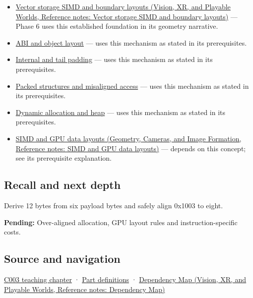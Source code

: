 \begin{itemize}
\item
  \href{../07-Vision-XR-and-Playable-Worlds/main.pdf\#nameddest=appendix-26bf6bf2fb8b}{Vector storage SIMD and boundary layouts (Vision, XR, and Playable Worlds, Reference notes: Vector storage SIMD and boundary layouts)} --- Phase 6 uses this established foundation in its geometry narrative.
\item
  \hyperref[appendix-c4ac6bb0fff8]{ABI and object layout} --- uses this mechanism as stated in its prerequisites.
\item
  \hyperref[appendix-f52f8c5a3afd]{Internal and tail padding} --- uses this mechanism as stated in its prerequisites.
\item
  \hyperref[appendix-0682dbfc5f0e]{Packed structures and misaligned access} --- uses this mechanism as stated in its prerequisites.
\item
  \hyperref[appendix-c3480f7d9ff3]{Dynamic allocation and heap} --- uses this mechanism as stated in its prerequisites.
\item
  \href{../03-Geometry-Cameras-and-Image-Formation/main.pdf\#nameddest=appendix-3c7b1a56de01}{SIMD and GPU data layouts (Geometry, Cameras, and Image Formation, Reference notes: SIMD and GPU data layouts)} --- depends on this concept; see its prerequisite explanation.
\end{itemize}

\subsection{Recall and next depth}\label{appendix-a1f7c53b4742-recall-and-next-depth}

Derive 12 bytes from six payload bytes and safely align 0x1003 to eight.

\textbf{Pending:} Over-aligned allocation, GPU layout rules and instruction-specific costs.

\subsection{Source and navigation}\label{appendix-a1f7c53b4742-source-and-navigation}

\hyperref[01-foundations-i-ch002-where-the-bytes-live]{C003 teaching chapter} · \hyperref[appendix-fd090d982a15-m003---parts-41-60]{Part definitions} · \href{../07-Vision-XR-and-Playable-Worlds/main.pdf\#nameddest=appendix-4ad47bdd269a}{Dependency Map (Vision, XR, and Playable Worlds, Reference notes: Dependency Map)}
